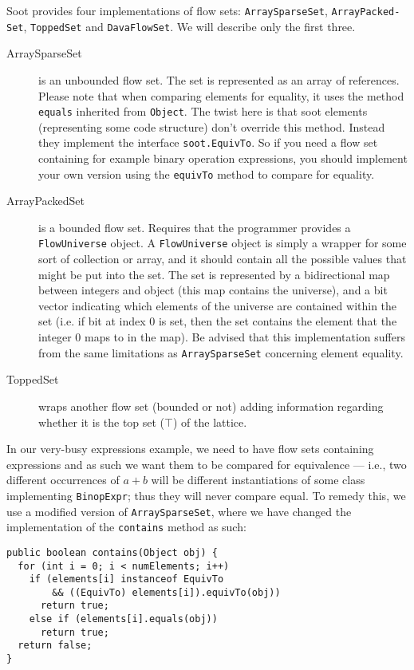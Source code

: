 \documentclass{article}
\newcommand{\code}[1]{\texttt{\small #1}}
\begin{document}
Soot provides four implementations of flow sets:
\code{ArraySparseSet}, \code{ArrayPacked- Set}, \code{ToppedSet} and
\code{DavaFlowSet}. We will describe only the first three.

\begin{description}
\item[ArraySparseSet] is an unbounded flow set. The set is represented
  as an array of references. Please note that when comparing elements
  for equality, it uses the method \code{equals} inherited from
  \code{Object}. The twist here is that soot elements (representing
  some code structure) don't override this method. Instead they
  implement the interface \code{soot.EquivTo}. So if you need a flow
  set containing for example binary operation expressions, you should
  implement your own version using the \code{equivTo} method to
  compare for equality.

\item[ArrayPackedSet] is a bounded flow set. Requires that the
  programmer provides a \code{FlowUniverse} object.  A
  \code{FlowUniverse} object is simply a wrapper for some sort of
  collection or array, and it should contain all the possible values
  that might be put into the set.  The set is represented by a
  bidirectional map between integers and object (this map contains the
  universe), and a bit vector indicating which elements of the
  universe are contained within the set (i.e. if bit at index 0 is
  set, then the set contains the element that the integer 0 maps to in
  the map). Be advised that this implementation suffers from the same
  limitations as \code{ArraySparseSet} concerning element equality.

\item[ToppedSet] wraps another flow set (bounded or not) adding
  information regarding whether it is the top set ($\top$) of the
  lattice.
\end{description}

In our very-busy expressions example, we need to have flow sets
containing expressions and as such we want them to be compared for
equivalence --- i.e., two different occurrences of $a+b$ will be
different instantiations of some class implementing \code{BinopExpr};
thus they will never compare equal. To remedy this, we use a modified
version of \code{ArraySparseSet}, where we have changed the
implementation of the \code{contains} method as such:
\begin{center}
  \begin{minipage}{0.9 \linewidth}
    \begin{verbatim}
public boolean contains(Object obj) {
  for (int i = 0; i < numElements; i++)
    if (elements[i] instanceof EquivTo
        && ((EquivTo) elements[i]).equivTo(obj))
      return true;
    else if (elements[i].equals(obj))
      return true;
  return false;
}
    \end{verbatim}
  \end{minipage}
\end{center}
\end{document}
